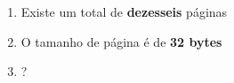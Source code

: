 \begin{question}

	\begin{enumerate}[label=1.\arabic* ]
		\item Existe um total de \textbf{dezesseis} páginas
  		\item O tamanho de página é de \textbf{32 bytes}
    	\item ?
	\end{enumerate}
\end{question}

